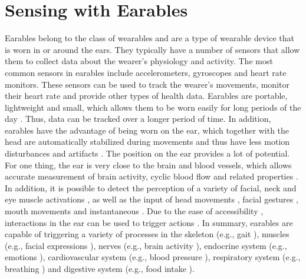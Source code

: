 \section{Sensing with Earables}
\label{Background:SensingWithEarables}
Earables belong to the class of wearables and are a type of wearable device that is worn in or around the ears. 
They typically have a number of sensors that allow them to collect data about the wearer's physiology and activity. 
The most common sensors in earables include accelerometers, gyroscopes and heart rate monitors. 
These sensors can be used to track the wearer's movements, monitor their heart rate and provide other types of health data.
Earables are portable, lightweight and small, which allows them to be worn easily for long periods of the day \cite{roddigerSensingEarablesSystematic2022a}. 
Thus, data can be tracked over a longer period of time. In addition, earables have the advantage of being worn on the ear, which together with the head are automatically stabilized during movements and thus have less motion disturbances and artifacts \cite{grossmanFrequencyVelocityRotational1988, kavanaghRoleNeckTrunk2006a}.
The position on the ear provides a lot of potential. 
For one thing, the ear is very close to the brain and blood vessels, which allows accurate measurement of brain activity, cyclic blood flow and related properties \cite{ferliniInEarPPGVital2022}.
In addition, it is possible to detect the perception of a variety of facial, neck and eye muscle activations \cite{andoCanalSenseFaceRelatedMovement2017}, as well as the input of head movements \cite{andoCanalSenseFaceRelatedMovement2017}, facial gestures \cite{matthiesEarFieldSensingNovelInEar2017}, mouth movements \cite{sunTeethTapRecognizingDiscrete2021a} and instantaneous \cite{bleichnerConcealedUnobtrusiveEarCentered2017, phamWAKEBehindtheearWearable2020}. 
Due to the ease of accessibility \cite{kikuchiEarTouchTurningEar2017, xuEarBuddyEnablingOnFace2020}, interactions in the ear can be used to trigger actions \cite{lissermannEarPutAugmentingEarworn2014}.
In summary, earables are capable of triggering a variety of processes in the skeleton (e.g., gait \cite{atallahGaitAsymmetryDetection2014}), muscles (e.g., facial expressions \cite{matthiesEarFieldSensingNovelInEar2017}), nerves (e.g., brain activity \cite{debenerUnobtrusiveAmbulatoryEEG2015}), endocrine system (e.g., emotions \cite{athavipachWearableInEarEEG2019}), cardiovascular system (e.g., blood pressure \cite{atallahValidationEarwornSensor2012}), respiratory system (e.g., breathing \cite{roddigerRespirationRateMonitoring2020}) and digestive system (e.g., food intake \cite{gaoIHearFoodEating2016}).

